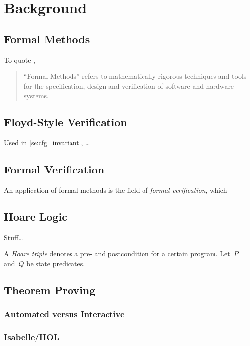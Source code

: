 \chapter{Background}\label{ch:background}


\section{Formal Methods}
To quote \citet{butler:fm},
\begin{quote}
  ``Formal Methods'' refers to mathematically rigorous techniques and tools
  for the specification, design and verification of software and hardware systems.
\end{quote}

\section{Floyd-Style Verification}\label{ch:floyd}
%
Used in \cref{se:cfg_invariant},
\dots

\section{Formal Verification}
An application of formal methods is the field of \emph{formal verification},%
%
which 
\section{Hoare Logic}
Stuff\dots~\citep{hoare1969axiomatic,myreen2007hoare}%

A \emph{Hoare triple} denotes a pre- and postcondition for a certain program.%
%
%
Let~$P$ and~$Q$ be state predicates.

\section{Theorem Proving}
%

\subsection{Automated versus Interactive}

\subsection{Isabelle/HOL}
%


